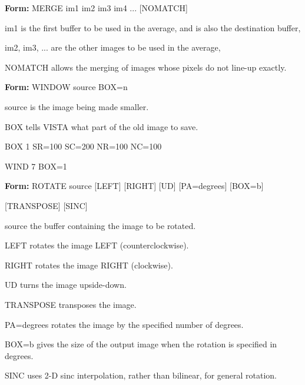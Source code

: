 {\newpage\clearpage
{}%
\begin{command}
  \item[\textbf{Form: }MERGE im1 im2 im3 im4 ... {[NOMATCH]}\hfill]{}
  \item[im1]{is the first buffer to be used in the average,
       and is also the destination buffer,}
  \item[im2, im3, ...]{are the other images to be used in the average,}
  \item[NOMATCH]{allows the merging of images whose pixels do not
line-up exactly.}
\end{command}%
\lthtmlfigureZ
\lthtmlcheckvsize\clearpage}

{\newpage\clearpage
{}%
\begin{command}
  \item[\textbf{Form: }WINDOW source BOX=n\hfill]{}
  \item[source]{is the image being made smaller.}
  \item[BOX]{tells VISTA what part of the old image to save.}
\end{command}%
\lthtmlfigureZ
\lthtmlcheckvsize\clearpage}

{\newpage\clearpage
{}%
\begin{hanging}
  \item{BOX 1 SR=100 SC=200 NR=100 NC=100}
  \item{WIND 7 BOX=1}
\end{hanging}%
\lthtmlfigureZ
\lthtmlcheckvsize\clearpage}

{\newpage\clearpage
{}%
\begin{command}
  \item[\textbf{Form: }   ROTATE source {[LEFT]} {[RIGHT]} {[UD]} 
       {[PA=degrees]} {[BOX=b]} \hfill]{}
  \item{{[TRANSPOSE]} {[SINC]}}
  \item[source]{the buffer containing the image to be rotated.}
  \item[LEFT]{rotates the image LEFT (counterclockwise).}
  \item[RIGHT]{rotates the image RIGHT (clockwise).}
  \item[UD]{turns the image upside-down.}
  \item[TRANSPOSE]{transposes the image.}
  \item[PA=degrees]{rotates the image by the specified number of degrees.}
  \item[BOX=b]{gives the size of the output image when the rotation is 
       specified in degrees.}
  \item[SINC]{uses 2-D sinc interpolation, rather than bilinear,
       for general rotation.}
\end{command}%
\lthtmlfigureZ
\lthtmlcheckvsize\clearpage}

